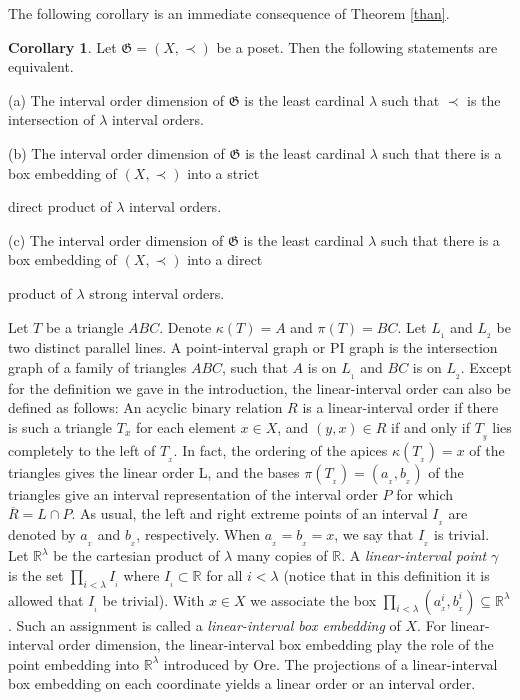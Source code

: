 \documentclass{article}
\theoremstyle{definition}
\newtheorem{corollary}[theorem]{Corollary}
\begin{document}
The following corollary is an immediate consequence of Theorem \ref{than}.




\begin{corollary}\label{a129} Let $\mathfrak{G}=(X,\prec)$ be a poset. Then the following statements are equivalent.
\par\noindent
(a) The interval order dimension of $\mathfrak{G}$ is the least cardinal $\lambda$ such that $\prec$ is the intersection of $\lambda$ interval orders.
\par\noindent
(b) The interval order dimension of $\mathfrak{G}$
is the least cardinal $\lambda$ such that there is a box embedding of $(X,\prec)$ into a strict  

\! \!\!direct product of $\lambda$ interval orders.
\par\noindent
(c) The interval order dimension of $\mathfrak{G}$
is the least cardinal $\lambda$ such that there is a box embedding of $(X,\prec)$ into a direct 

\! \!\!product 
of $\lambda$ strong interval orders.
\end{corollary}





Let $T$ be a triangle $ABC$. Denote $\kappa(T)=A$ and $\pi(T)=BC$. 
Let $L_{_1}$ and $L_{_2}$  be two distinct parallel lines.
A point-interval graph or PI graph is the intersection graph of a family of triangles $ABC$, such that $A$ is on $L_{_1}$ and $BC$ is on $L_{_2}$. Except for the definition we gave
in the introduction,
the linear-interval order can also be defined as follows: An acyclic binary relation $R$ is a linear-interval order if there is such a triangle $T_x$ for each element $x\in X$, and $(y,x)\in R$ if and only if $T_{_y}$ lies completely to the left of $T_{_x}$. 
In fact, 
the ordering of the apices $\kappa(T_{_x})=x$ of the triangles gives the linear order L, and the bases $\pi(T_{_x})=(a_{_x},b_{_x})$ of the triangles give an interval representation of the interval order $P$ for which $\overline{R}=L\cap P$.
As usual, the left and right extreme points of an interval $I_{_x}$ are denoted by 
$a_{_x}$ and $b_{_x}$, respectively. 
When $a_{_x}=b_{_x}=x$, we say that $I_{_x}$ is trivial. 
Let $\mathbb{R}^\lambda$ be the cartesian product of $\lambda$ many copies of $\mathbb{R}$. A {\it linear-interval point} $\gamma$ is the set 
$\displaystyle\prod_{i<\lambda}I_{_i}$ where $I_{_i}\subset \mathbb{R}$ for all $i<\lambda$
(notice that in this definition it is allowed that $I_{_i}$ be trivial).
With $x\in X$ we associate the box $\displaystyle\prod_{i<\lambda}(a_{_x}^{i},b_{_x}^{i})\subseteq \mathbb{R}^\lambda$. 
Such an assignment is called a {\it linear-interval box embedding} of $X$.
For linear-interval order dimension, the linear-interval box embedding play the role of the point embedding into $\mathbb{R}^\lambda$
introduced by Ore. 
The projections of  a linear-interval box embedding on each coordinate yields a 
linear order or an interval order.
\end{document}
